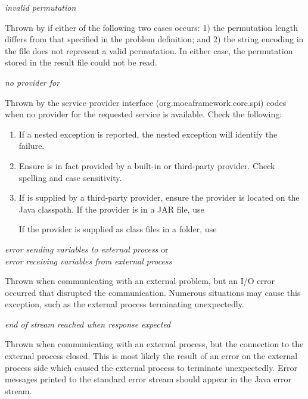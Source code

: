 \noindent  
\textit{invalid permutation}
\begin{indented}
  Thrown by  if either of the following two cases occurs: 1) the permutation length differs from that specified in the problem definition; and 2) the string encoding in the file does not represent a valid permutation.  In either case, the permutation stored in the result file could not be read.
\end{indented}

\noindent
\textit{no provider for }
\begin{indented}
  Thrown by the service provider interface (org.moeaframework.core.spi) codes when no provider for the requested service is available.  Check the following:
  \begin{enumerate}
    \item If a nested exception is reported, the nested exception will identify the failure.
    \item Ensure  is in fact provided by a built-in or third-party provider. Check spelling and case sensitivity.
    \item If  is supplied by a third-party provider, ensure the provider is located on the Java classpath.  If the provider is in a JAR file, use
      \begin{indented}
      \end{indented}
      If the provider is supplied as class files in a folder, use
      \begin{indented}
      \end{indented}
  \end{enumerate}
\end{indented}

\noindent
\textit{error sending variables to external process} or\\
\textit{error receiving variables from external process}
\begin{indented}
  Thrown when communicating with an external problem, but an I/O error occurred that disrupted the communication.  Numerous situations may cause this exception, such as the external process terminating unexpectedly.
\end{indented}

\noindent
\textit{end of stream reached when response expected}
\begin{indented}
  Thrown when communicating with an external process, but the connection to the external process closed.  This is most likely the result of an error on the external process side which caused the external process to terminate unexpectedly.  Error messages printed to the standard error stream should appear in the Java error stream.
\end{indented}

